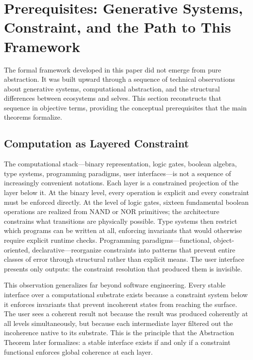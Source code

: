 \documentclass[12pt, a4paper]{article}
\theoremstyle{plain}
\theoremstyle{definition}
\theoremstyle{remark}
\begin{document}
\newpage
\tableofcontents
\newpage

\section{Prerequisites: Generative Systems, Constraint, and the Path to This Framework}

The formal framework developed in this paper did not emerge from pure abstraction. It was built upward through a sequence of technical observations about generative systems, computational abstraction, and the structural differences between ecosystems and selves. This section reconstructs that sequence in objective terms, providing the conceptual prerequisites that the main theorems formalize.

\subsection{Computation as Layered Constraint}

The computational stack---binary representation, logic gates, boolean algebra, type systems, programming paradigms, user interfaces---is not a sequence of increasingly convenient notations. Each layer is a constrained projection of the layer below it. At the binary level, every operation is explicit and every constraint must be enforced directly. At the level of logic gates, sixteen fundamental boolean operations are realized from NAND or NOR primitives; the architecture constrains what transitions are physically possible. Type systems then restrict which programs can be written at all, enforcing invariants that would otherwise require explicit runtime checks. Programming paradigms---functional, object-oriented, declarative---reorganize constraints into patterns that prevent entire classes of error through structural rather than explicit means. The user interface presents only outputs: the constraint resolution that produced them is invisible.

This observation generalizes far beyond software engineering. Every stable interface over a computational substrate exists because a constraint system below it enforces invariants that prevent incoherent states from reaching the surface. The user sees a coherent result not because the result was produced coherently at all levels simultaneously, but because each intermediate layer filtered out the incoherence native to its substrate. This is the principle that the Abstraction Theorem later formalizes: a stable interface exists if and only if a constraint functional enforces global coherence at each layer.
\end{document}
